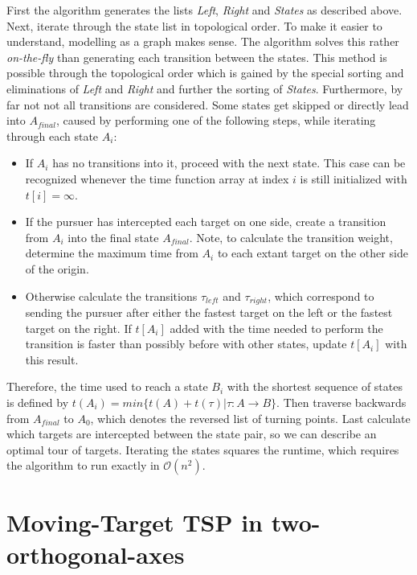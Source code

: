 \documentclass[english,version-2019-07]{uzl-thesis}
\begin{document}
First the algorithm generates the lists \emph{Left}, \emph{Right} and \emph{States} as described above. 
Next, iterate through the state list in topological order. To make it easier to understand, modelling as a graph makes sense. The algorithm solves this rather \emph{on-the-fly} than generating each transition between the states. This method is possible through the topological order which is gained by the special sorting and eliminations of \emph{Left} and \emph{Right} and further the sorting of \emph{States}. Furthermore, by far not not all transitions are considered. Some states get skipped or directly lead into $A_{final}$, caused by performing one of the following steps, while iterating through each state $A_i$:

\begin{itemize}
\item
If $A_i$ has no transitions into it, proceed with the next state. This case can be recognized whenever the time function array at index $i$ is still initialized with $t[i] = \infty$. 
\item
If the pursuer has intercepted each target on one side, create a transition from $A_i$ into
the final state $A_{final}$. Note, to calculate the transition weight, determine the maximum time from $A_i$ to each extant target on the other side of the origin.
\item
Otherwise calculate the transitions $\tau_{left}$ and $\tau_{right}$, which correspond to sending the pursuer after either the fastest target on the left or the fastest target on the right. If $t[A_i]$ added with the time needed to perform the transition is faster than possibly before with other states, update $t[A_i]$ with this result.
\end{itemize}

Therefore, the time used to reach a state $B_i$ with the shortest sequence of states is defined by $t(A_i)=min\{t(A)+t(\tau)\vert\tau:A\rightarrow B\}$. Then traverse backwards from $A_{final}$ to $A_0$, which denotes the reversed list of turning points. Last calculate which targets are intercepted between the state pair, so we can describe an optimal tour of targets. Iterating the states squares the runtime, which requires the algorithm to run exactly in $\mathcal{O}(n^2)$.


\chapter{Moving-Target TSP in two-orthogonal-axes}
\end{document}
